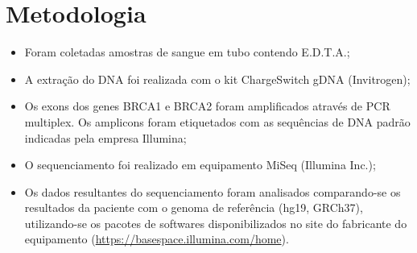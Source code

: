 \section{Metodologia}
\begin{itemize}
\item Foram coletadas amostras de sangue em tubo contendo E.D.T.A.;

\item A extração do DNA foi realizada com o kit ChargeSwitch\textsuperscript{\textregistered} gDNA (Invitrogen);

\item Os exons dos genes BRCA1 e BRCA2 foram amplificados através de PCR multiplex. Os amplicons foram etiquetados com as sequências de DNA padrão indicadas pela empresa Illumina;

\item O sequenciamento foi realizado em equipamento MiSeq (Illumina Inc.);

\item Os dados resultantes do sequenciamento foram analisados comparando-se os resultados da paciente com o genoma de referência (hg19, GRCh37), utilizando-se os pacotes de softwares disponibilizados no site do fabricante do equipamento (\url{https://basespace.illumina.com/home}).
\end{itemize}
